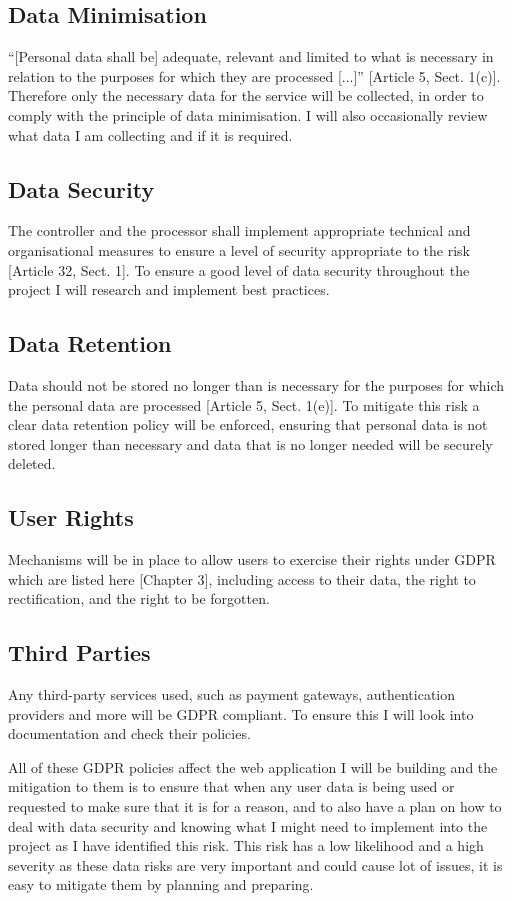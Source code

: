 \documentclass[]{project_report}
\begin{document}
\subsection{Data Minimisation}
“[Personal data shall be] adequate, relevant and limited to what is necessary in relation to the purposes for which they are processed [...]” \cite{gdpr_2016} [Article 5, Sect. 1(c)]. Therefore only the necessary data for the service will be collected, in order to comply with the principle of data minimisation. I will also occasionally review what data I am collecting and if it is required.

\subsection{Data Security}
The controller and the processor shall implement appropriate technical and organisational measures to ensure a level of security appropriate to the risk \cite{gdpr_2016} [Article 32, Sect. 1]. To ensure a good level of data security throughout the project I will research and implement best practices.

\subsection{Data Retention}
Data should not be stored no longer than is necessary for the purposes for which the personal data are processed \cite{gdpr_2016} [Article 5, Sect. 1(e)]. To mitigate this risk a clear data retention policy will be enforced, ensuring that personal data is not stored longer than necessary and data that is no longer needed will be securely deleted.

\subsection{User Rights}
Mechanisms will be in place to allow users to exercise their rights under GDPR which are listed here \cite{gdpr_2016} [Chapter 3], including access to their data, the right to rectification, and the right to be forgotten.

\subsection{Third Parties}
Any third-party services used, such as payment gateways, authentication providers and more will be GDPR compliant. To ensure this I will look into documentation and check their policies.

All of these GDPR policies affect the web application I will be building and the mitigation to them is to ensure that when any user data is being used or requested to make sure that it is for a reason, and to also have a 
plan on how to deal with data security and knowing what I might need to implement into the project as I have identified this risk. This risk has a low likelihood and a high severity as these data risks are very important and could cause lot of issues, it is easy to mitigate them by planning and preparing.
\end{document}
